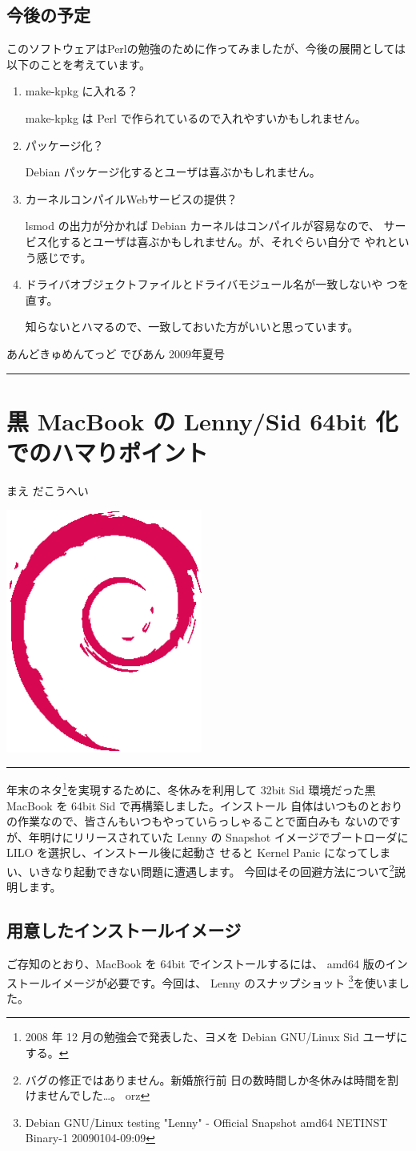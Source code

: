 \documentclass[mingoth,a4paper]{jsarticle}
\renewcommand{\dancersection}[2]{%
\newpage
あんどきゅめんてっど でびあん 2009年夏号
%
\vspace{0.1mm}\\
{\color{dancerlightblue}\rule{\hsize}{2mm}}

%
%
\begin{minipage}[t]{0.6\hsize}
\color{dancerdarkblue}
\vspace{1cm}
\section{#1}
\hfill{}#2\\
\end{minipage}
\begin{minipage}[t]{0.4\hsize}
\vspace{-2cm}
\hfill{}\includegraphics[height=8cm]{image200502/openlogo-nd.eps}\\
\vspace{-5cm}
\end{minipage}
%
%
{\color{dancerdarkblue}\rule{0.74\hsize}{2mm}}
%
\vspace{2cm}
}
\begin{document}
\subsection{今後の予定}
このソフトウェアはPerlの勉強のために作ってみましたが、今後の展開としては
以下のことを考えています。
\begin{enumerate}
 \item make-kpkg に入れる？

       make-kpkg は Perl で作られているので入れやすいかもしれません。

 \item パッケージ化？

       Debian パッケージ化するとユーザは喜ぶかもしれません。

 \item カーネルコンパイルWebサービスの提供？

       lsmod の出力が分かれば Debian カーネルはコンパイルが容易なので、
       サービス化するとユーザは喜ぶかもしれません。が、それぐらい自分で
       やれという感じです。

 \item ドライバオブジェクトファイルとドライバモジュール名が一致しないや
       つを直す。

       知らないとハマるので、一致しておいた方がいいと思っています。
\end{enumerate}


\dancersection{黒 MacBook の Lenny/Sid 64bit 化でのハマりポイント}{まえ
だこうへい}

年末のネタ\footnote{2008 年 12 月の勉強会で発表した、ヨメを Debian
GNU/Linux Sid ユーザにする。}を実現するために、冬休みを利用して 32bit
Sid 環境だった黒 MacBook を 64bit Sid で再構築しました。インストール
自体はいつものとおりの作業なので、皆さんもいつもやっていらっしゃることで面白みも
ないのですが、年明けにリリースされていた Lenny の
Snapshot イメージでブートローダに LILO を選択し、インストール後に起動さ
せると Kernel Panic になってしまい、いきなり起動できない問題に遭遇します。
今回はその回避方法について\footnote{バグの修正ではありません。新婚旅行前
日の数時間しか冬休みは時間を割けませんでした…。 orz}説明します。


\subsection{用意したインストールイメージ}
ご存知のとおり、MacBook を 64bit でインストールするには、 amd64 版のイン
ストールイメージが必要です。今回は、 Lenny のスナップショット
\footnote{Debian GNU/Linux testing "Lenny" - Official Snapshot amd64
NETINST Binary-1 20090104-09:09}を使いました。
\end{document}
